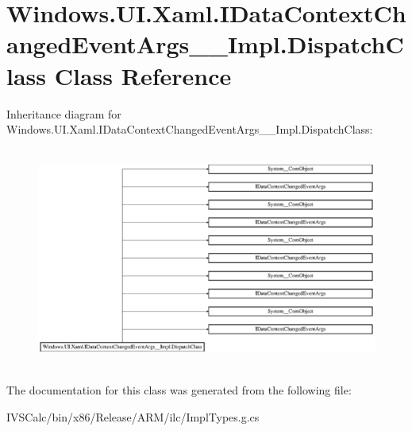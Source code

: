 \hypertarget{class_windows_1_1_u_i_1_1_xaml_1_1_i_data_context_changed_event_args_____impl_1_1_dispatch_class}{}\section{Windows.\+U\+I.\+Xaml.\+I\+Data\+Context\+Changed\+Event\+Args\+\_\+\+\_\+\+Impl.\+Dispatch\+Class Class Reference}
\label{class_windows_1_1_u_i_1_1_xaml_1_1_i_data_context_changed_event_args_____impl_1_1_dispatch_class}
Inheritance diagram for Windows.\+U\+I.\+Xaml.\+I\+Data\+Context\+Changed\+Event\+Args\+\_\+\+\_\+\+Impl.\+Dispatch\+Class\+:\begin{figure}[H]
\begin{center}
\leavevmode
\includegraphics[height=7.298578cm]{class_windows_1_1_u_i_1_1_xaml_1_1_i_data_context_changed_event_args_____impl_1_1_dispatch_class}
\end{center}
\end{figure}


The documentation for this class was generated from the following file\+:\begin{DoxyCompactItemize}
\item 
I\+V\+S\+Calc/bin/x86/\+Release/\+A\+R\+M/ilc/Impl\+Types.\+g.\+cs\end{DoxyCompactItemize}
